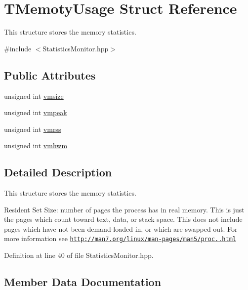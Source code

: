 \hypertarget{struct_t_memoty_usage}{}\section{T\+Memoty\+Usage Struct Reference}
\label{struct_t_memoty_usage}


This structure stores the memory statistics.  




{\ttfamily \#include $<$Statistics\+Monitor.\+hpp$>$}

\subsection*{Public Attributes}
\begin{DoxyCompactItemize}
\item 
unsigned int \hyperlink{struct_t_memoty_usage_a85cd99dcbca0d070abd2a5c3301375d4}{vmsize}
\item 
unsigned int \hyperlink{struct_t_memoty_usage_a4d66cce3c91b795c15e9de158d2658f5}{vmpeak}
\item 
unsigned int \hyperlink{struct_t_memoty_usage_a968cf005ed24343dd992ab89ab361686}{vmrss}
\item 
unsigned int \hyperlink{struct_t_memoty_usage_a66089e06d885f009f50872d8c0ccd3b3}{vmhwm}
\end{DoxyCompactItemize}


\subsection{Detailed Description}
This structure stores the memory statistics. 

Resident Set Size\+: number of pages the process has in real memory. This is just the pages which count toward text, data, or stack space. This does not include pages which have not been demand-\/loaded in, or which are swapped out. For more information see \href{http://man7.org/linux/man-pages/man5/proc.5.html}{\tt http\+://man7.\+org/linux/man-\/pages/man5/proc..\+html} 

Definition at line 40 of file Statistics\+Monitor.\+hpp.



\subsection{Member Data Documentation}
\hypertarget{struct_t_memoty_usage_a66089e06d885f009f50872d8c0ccd3b3}{}
